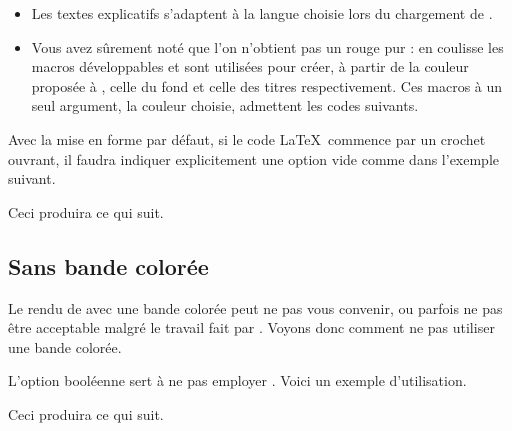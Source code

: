 \documentclass[10pt, a4paper]{article}
\begin{document}
\begin{bdocnote}
    \leavevmode

    \begin{itemize}
        \item Les textes explicatifs s'adaptent à la langue choisie lors du chargement de .

        \item Vous avez sûrement noté que l'on n'obtient pas un rouge pur : en coulisse les macros développables  et  sont utilisées pour créer, à partir de la couleur proposée à , celle du fond et celle des titres respectivement.
              Ces macros à un seul argument, la couleur choisie, admettent les codes suivants.

              \begin{bdoclatex}[code]
              \end{bdoclatex}
    \end{itemize}
\end{bdocnote}




\begin{bdocwarn}
    Avec la mise en forme par défaut, si le code \LaTeX\ commence par un crochet ouvrant, il faudra indiquer explicitement une option vide comme dans l'exemple suivant.


    Ceci produira ce qui suit.

    \medskip

    
\end{bdocwarn}




\subsection{Sans bande colorée}

Le rendu de  avec une bande colorée peut ne pas vous convenir, ou parfois ne pas être acceptable malgré le travail fait par .
Voyons donc comment ne pas utiliser une bande colorée.

\begin{bdocexa}
    L'option booléenne  sert à ne pas employer .
    Voici un exemple d'utilisation.


    Ceci produira ce qui suit.

    \medskip

    
\end{bdocexa}
\end{document}
